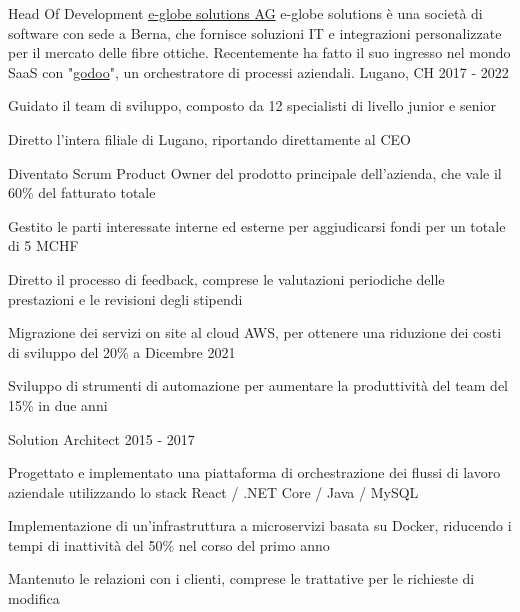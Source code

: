 \begin{cventries}
	\cventry
	{Head Of Development} %
	{\href{https://www.e-globe-solutions.com}{e-globe solutions AG}} %
  {e-globe solutions è una società di software con sede a Berna, che fornisce soluzioni IT e integrazioni personalizzate per il mercato delle fibre ottiche. Recentemente ha fatto il suo ingresso nel mondo SaaS con "\href{https://www.godoo.ch}{godoo}", un orchestratore di processi aziendali.} %
	{Lugano, CH} %
	{2017 - 2022} %
	{
		\begin{cvitems} %
			\item {Guidato il team di sviluppo, composto da 12 specialisti di livello junior e senior}
			\item {Diretto l'intera filiale di Lugano, riportando direttamente al CEO}
			\item {Diventato Scrum Product Owner del prodotto principale dell'azienda, che vale il 60\% del fatturato totale}
			\item {Gestito le parti interessate interne ed esterne per aggiudicarsi fondi per un totale di 5 MCHF}
			\item {Diretto il processo di feedback, comprese le valutazioni periodiche delle prestazioni e le revisioni degli stipendi}
			\item {Migrazione dei servizi on site al cloud AWS, per ottenere una riduzione dei costi di sviluppo del 20\% a Dicembre 2021}
			\item {Sviluppo di strumenti di automazione per aumentare la produttività del team del 15\% in due anni}
		\end{cvitems}
	}

  \cventry
    {Solution Architect} %
    {} %
    {} %
    {} %
    {2015 - 2017} %
    {
      \begin{cvitems} %
        \item {Progettato e implementato una piattaforma di orchestrazione dei flussi di lavoro aziendale utilizzando lo stack React / .NET Core / Java / MySQL}
        \item {Implementazione di un'infrastruttura a microservizi basata su Docker, riducendo i tempi di inattività del 50\% nel corso del primo anno}
        \item {Mantenuto le relazioni con i clienti, comprese le trattative per le richieste di modifica}
      \end{cvitems}
    }


\end{cventries}
